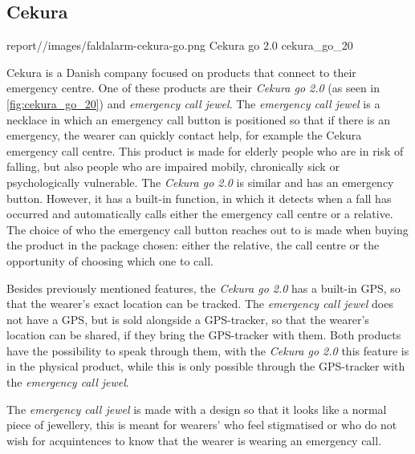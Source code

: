 \subsection{Cekura}


    {report//images/faldalarm-cekura-go.png}
    {Cekura go 2.0}
    {cekura_go_20}



Cekura is a Danish company focused on products that connect to their emergency centre. One of these products are their \textit{Cekura go 2.0}\cite{noauthor_ny_nodate} (as seen in \ref{fig:cekura_go_20}) and \textit{emergency call jewel}\cite{noauthor_tryghedsalarm_nodate}. The \textit{emergency call jewel} is a necklace in which an emergency call button is positioned so that if there is an emergency, the wearer can quickly contact help, for example the Cekura emergency call centre. This product is made for elderly people who are in risk of falling, but also people who are impaired mobily, chronically sick or psychologically vulnerable. The\textit{ Cekura go 2.0} is similar and has an emergency button. However, it has a built-in function, in which it detects when a fall has occurred and automatically calls either the emergency call centre or a relative. The choice of who the emergency call button reaches out to is made when buying the product in the package chosen: either the relative, the call centre or the opportunity of choosing which one to call. 

Besides previously mentioned features, the \textit{Cekura go 2.0 }has a built-in GPS, so that the wearer's exact location can be tracked. The \textit{emergency call jewel }does not have a GPS, but is sold alongside a GPS-tracker, so that the wearer’s location can be shared, if they bring the GPS-tracker with them. Both products have the possibility to speak through them, with the \textit{Cekura go 2.0} this feature is in the physical product, while this is only possible through the GPS-tracker with the \textit{emergency call jewel}. 

The \textit{emergency call jewel }is made with a design so that it looks like a normal piece of jewellery, this is meant for wearers' who feel stigmatised or who do not wish for acquintences to know that the wearer is wearing an emergency call. 
